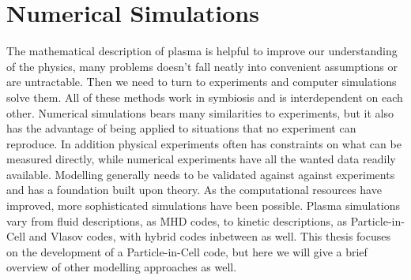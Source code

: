 \section{Numerical Simulations}

	The mathematical description of plasma is helpful to improve our
	understanding of the physics, many problems doesn't fall neatly into convenient
	assumptions or are untractable. Then we need to turn to experiments and computer simulations
	solve them. All of these methods work in symbiosis and is interdependent
	on each other. Numerical simulations bears many similarities to
	experiments, but it also has the advantage of being applied to situations that no
	experiment can reproduce. In addition physical experiments often has constraints on what can
 	be measured directly, while numerical experiments have all the wanted data readily available.
	Modelling generally needs to be validated against
	against experiments and has a foundation built upon theory. As the computational
	resources have improved, more sophisticated simulations have been possible.
	Plasma simulations vary from fluid descriptions, as MHD codes, to kinetic descriptions,
	as Particle-in-Cell and Vlasov codes, with hybrid codes inbetween as well.
	This thesis focuses on the development of a Particle-in-Cell code, but here we will give a brief
	overview of other modelling approaches as well.

